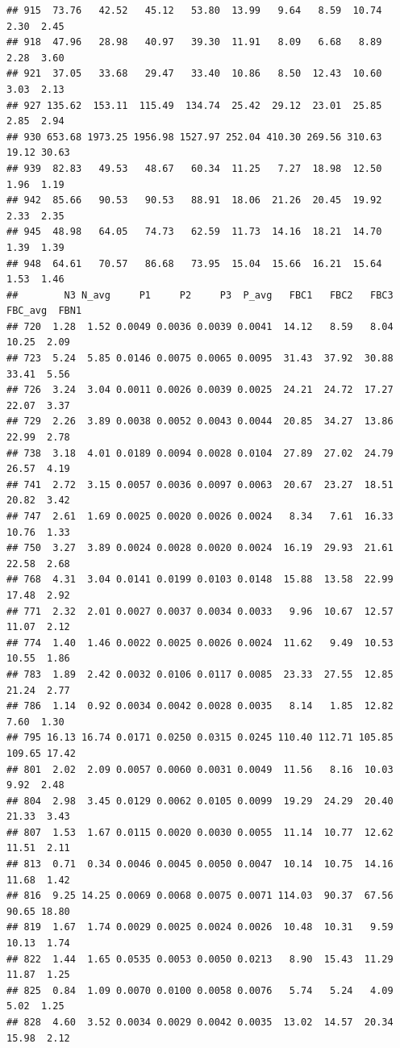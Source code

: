 \documentclass[]{article}
\begin{document}
\begin{verbatim}
## 915  73.76   42.52   45.12   53.80  13.99   9.64   8.59  10.74  2.30  2.45
## 918  47.96   28.98   40.97   39.30  11.91   8.09   6.68   8.89  2.28  3.60
## 921  37.05   33.68   29.47   33.40  10.86   8.50  12.43  10.60  3.03  2.13
## 927 135.62  153.11  115.49  134.74  25.42  29.12  23.01  25.85  2.85  2.94
## 930 653.68 1973.25 1956.98 1527.97 252.04 410.30 269.56 310.63 19.12 30.63
## 939  82.83   49.53   48.67   60.34  11.25   7.27  18.98  12.50  1.96  1.19
## 942  85.66   90.53   90.53   88.91  18.06  21.26  20.45  19.92  2.33  2.35
## 945  48.98   64.05   74.73   62.59  11.73  14.16  18.21  14.70  1.39  1.39
## 948  64.61   70.57   86.68   73.95  15.04  15.66  16.21  15.64  1.53  1.46
##        N3 N_avg     P1     P2     P3  P_avg   FBC1   FBC2   FBC3 FBC_avg  FBN1
## 720  1.28  1.52 0.0049 0.0036 0.0039 0.0041  14.12   8.59   8.04   10.25  2.09
## 723  5.24  5.85 0.0146 0.0075 0.0065 0.0095  31.43  37.92  30.88   33.41  5.56
## 726  3.24  3.04 0.0011 0.0026 0.0039 0.0025  24.21  24.72  17.27   22.07  3.37
## 729  2.26  3.89 0.0038 0.0052 0.0043 0.0044  20.85  34.27  13.86   22.99  2.78
## 738  3.18  4.01 0.0189 0.0094 0.0028 0.0104  27.89  27.02  24.79   26.57  4.19
## 741  2.72  3.15 0.0057 0.0036 0.0097 0.0063  20.67  23.27  18.51   20.82  3.42
## 747  2.61  1.69 0.0025 0.0020 0.0026 0.0024   8.34   7.61  16.33   10.76  1.33
## 750  3.27  3.89 0.0024 0.0028 0.0020 0.0024  16.19  29.93  21.61   22.58  2.68
## 768  4.31  3.04 0.0141 0.0199 0.0103 0.0148  15.88  13.58  22.99   17.48  2.92
## 771  2.32  2.01 0.0027 0.0037 0.0034 0.0033   9.96  10.67  12.57   11.07  2.12
## 774  1.40  1.46 0.0022 0.0025 0.0026 0.0024  11.62   9.49  10.53   10.55  1.86
## 783  1.89  2.42 0.0032 0.0106 0.0117 0.0085  23.33  27.55  12.85   21.24  2.77
## 786  1.14  0.92 0.0034 0.0042 0.0028 0.0035   8.14   1.85  12.82    7.60  1.30
## 795 16.13 16.74 0.0171 0.0250 0.0315 0.0245 110.40 112.71 105.85  109.65 17.42
## 801  2.02  2.09 0.0057 0.0060 0.0031 0.0049  11.56   8.16  10.03    9.92  2.48
## 804  2.98  3.45 0.0129 0.0062 0.0105 0.0099  19.29  24.29  20.40   21.33  3.43
## 807  1.53  1.67 0.0115 0.0020 0.0030 0.0055  11.14  10.77  12.62   11.51  2.11
## 813  0.71  0.34 0.0046 0.0045 0.0050 0.0047  10.14  10.75  14.16   11.68  1.42
## 816  9.25 14.25 0.0069 0.0068 0.0075 0.0071 114.03  90.37  67.56   90.65 18.80
## 819  1.67  1.74 0.0029 0.0025 0.0024 0.0026  10.48  10.31   9.59   10.13  1.74
## 822  1.44  1.65 0.0535 0.0053 0.0050 0.0213   8.90  15.43  11.29   11.87  1.25
## 825  0.84  1.09 0.0070 0.0100 0.0058 0.0076   5.74   5.24   4.09    5.02  1.25
## 828  4.60  3.52 0.0034 0.0029 0.0042 0.0035  13.02  14.57  20.34   15.98  2.12

\end{verbatim}
\end{document}
